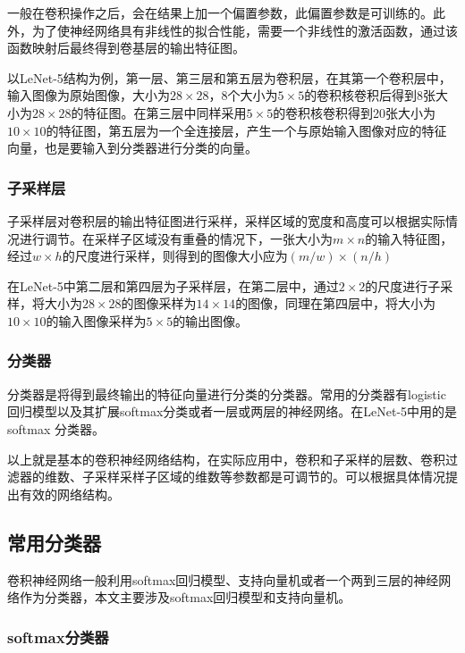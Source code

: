 \documentclass[bachelor,zhspacing]{cqu}  %
\begin{document}
一般在卷积操作之后，会在结果上加一个偏置参数，此偏置参数是可训练的。此外，为了使神经网络具有非线性的拟合性能，需要一个非线性的激活函数，通过该函数映射后最终得到卷基层的输出特征图。

以LeNet-5结构为例，第一层、第三层和第五层为卷积层，在其第一个卷积层中，输入图像为原始图像，大小为\(28\times 28\)，8个大小为\(5 \times 5\)的卷积核卷积后得到8张大小为\(28\times 28\)的特征图。在第三层中同样采用\(5 \times 5\)的卷积核卷积得到20张大小为\(10\times 10\)的特征图，第五层为一个全连接层，产生一个与原始输入图像对应的特征向量，也是要输入到分类器进行分类的向量。

\subsubsection{子采样层}\label{ux5b50ux91c7ux6837ux5c42}

子采样层对卷积层的输出特征图进行采样，采样区域的宽度和高度可以根据实际情况进行调节。在采样子区域没有重叠的情况下，一张大小为\(m\times n\)的输入特征图，经过\(w\times h\)的尺度进行采样，则得到的图像大小应为\((m/w)\times (n/h)\)

在LeNet-5中第二层和第四层为子采样层，在第二层中，通过\(2\times 2\)的尺度进行子采样，将大小为\(28\times 28\)的图像采样为\(14\times14\)的图像，同理在第四层中，将大小为\(10\times 10\)的输入图像采样为\(5\times 5\)的输出图像。

\subsubsection{分类器}\label{ux5206ux7c7bux5668}

分类器是将得到最终输出的特征向量进行分类的分类器。常用的分类器有logistic回归模型以及其扩展softmax分类或者一层或两层的神经网络。在LeNet-5中用的是softmax
分类器。

以上就是基本的卷积神经网络结构，在实际应用中，卷积和子采样的层数、卷积过滤器的维数、子采样采样子区域的维数等参数都是可调节的。可以根据具体情况提出有效的网络结构。

\subsection{常用分类器}\label{ux5e38ux7528ux5206ux7c7bux5668}

卷积神经网络一般利用softmax回归模型、支持向量机或者一个两到三层的神经网络作为分类器，本文主要涉及softmax回归模型和支持向量机。

\subsubsection{softmax分类器}\label{softmaxux5206ux7c7bux5668}
\end{document}
